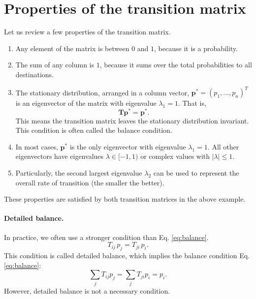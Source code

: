 \documentclass[12pt]{article}
\begin{document}
\section{Properties of the transition matrix}

Let us review a few properties of the transition matrix.
%
\begin{enumerate}
  \item Any element of the matrix is between $0$ and $1$,
    because it is a probability.
  \item The sum of any column is $1$, because it
    sums over the total probabilities to all destinations.
  \item The stationary distribution, arranged in a column vector,
      $\mathbf p^* = (p_1, \dots, p_n)^T$ is an eigenvector of the matrix
      with eigenvalue $\lambda_1 = 1$. That is,
      \begin{equation}
        \mathbf T \mathbf p^* = \mathbf p^*.
        \label{eq:balance}
      \end{equation}
      This means the transition matrix leaves
      the stationary distribution invariant.
      This condition is often called the balance condition.
  \item
      In most cases, $\mathbf p^*$ is the only eigenvector
      with eigenvalue $\lambda_1 = 1$.
      All other eigenvectors have eigenvalues $\lambda \in [-1, 1)$
        or complex values with $|\lambda| \le 1$.
  \item
      Particularly, the second largest eigenvalue $\lambda_2$ can be used to represent
      the overall rate of transition (the smaller the better).
\end{enumerate}
%
These properties are satisfied by both transition matrices
in the above example.

\paragraph*{Detailed balance.}

In practice, we often use a stronger condition than Eq. \eqref{eq:balance}.
\begin{equation}
  T_{ij} \, p_j = T_{ji} \, p_i.
  \label{eq:detailedbalance}
\end{equation}
This condition is called detailed balance,
which implies the balance condition Eq. \eqref{eq:balance}:
$$
\sum_j T_{ij} p_j = \sum_j T_{ji} p_i = p_i.
$$
However, detailed balance is not a necessary condition.
\end{document}
